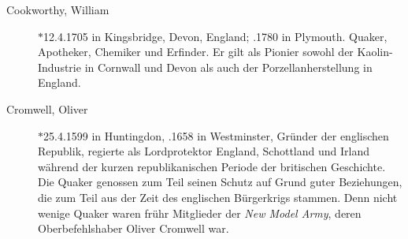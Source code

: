\begin{description}
 \item[Cookworthy, William]$\ast$12.4.1705 in Kingsbridge, Devon, England; .1780 in Plymouth. Quaker, Apotheker, Chemiker und Erfinder. Er gilt als Pionier sowohl der Kaolin-Industrie in Cornwall und Devon als auch der Porzellanherstellung in England.

 \item[Cromwell, Oliver] $\ast$25.4.1599 in Huntingdon, .1658 in Westminster, Gründer der englischen Republik, regierte als Lordprotektor England, Schottland und Irland während der kurzen republikanischen Periode der britischen Geschichte. Die Quaker genossen zum Teil seinen Schutz auf Grund guter Beziehungen, die zum Teil aus der Zeit des englischen Bürgerkrigs stammen. Denn nicht wenige Quaker waren frühr Mitglieder der \textit{New Model Army}, deren Oberbefehlshaber Oliver Cromwell war.

 \end{description}

\normalsize